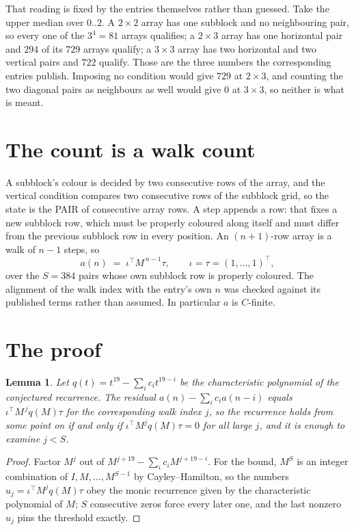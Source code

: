 \documentclass[11pt,a4paper]{article}
\theoremstyle{plain}
\newtheorem{lemma}[theorem]{Lemma}
\theoremstyle{definition}
\begin{document}
That reading is fixed by the entries themselves rather than guessed. Take the upper median
over $0..2$. A $2\times2$ array has one subblock and no neighbouring pair, so every one of the
$3^4=81$ arrays qualifies; a $2\times3$ array has one horizontal pair and $294$ of its $729$
arrays qualify; a $3\times3$ array has two horizontal and two vertical pairs and $722$
qualify. Those are the three numbers the corresponding entries publish. Imposing no condition
would give $729$ at $2\times3$, and counting the two diagonal pairs as neighbours as well
would give $0$ at $3\times3$, so neither is what is meant.

\section{The count is a walk count}

A subblock's colour is decided by two consecutive rows of the array, and
the vertical condition compares two consecutive rows of the subblock grid, so the state is the
PAIR of consecutive array rows. A step appends a row: that fixes a new subblock row, which
must be properly coloured along itself and must differ from the previous subblock row in every
position. An $(n+1)$-row array is a walk of $n-1$ steps, so
\[
a(n)\;=\;\iota^{\!\top}M^{\,n-1}\tau,\qquad\iota=\tau=(1,\dots,1)^{\!\top},
\]
over the $S=384$ pairs whose own subblock row is properly coloured.
The alignment of the walk index with the entry's own $n$ was checked against its published
terms rather than assumed. In particular $a$ is $C$-finite.

\section{The proof}

\begin{lemma}\label{lem:crit}
Let $q(t)=t^{19}-\sum_i c_it^{19-i}$ be the characteristic polynomial of the
conjectured recurrence. The residual $a(n)-\sum_ic_ia(n-i)$ equals
$\iota^{\!\top}M^{\,j}q(M)\tau$ for the corresponding walk index $j$, so the recurrence
holds from some point on if and only if $\iota^{\!\top}M^{j}q(M)\tau=0$ for all large $j$,
and it is enough to examine $j<S$.
\end{lemma}

\begin{proof}
Factor $M^{j}$ out of $M^{j+19}-\sum_ic_iM^{j+19-i}$. For the bound, $M^{S}$
is an integer combination of $I,M,\dots,M^{S-1}$ by Cayley--Hamilton, so the numbers
$u_j=\iota^{\!\top}M^{j}q(M)\tau$ obey the monic recurrence given by the characteristic
polynomial of $M$; $S$ consecutive zeros force every later one, and the last nonzero $u_j$
pins the threshold exactly.
\end{proof}
\end{document}
